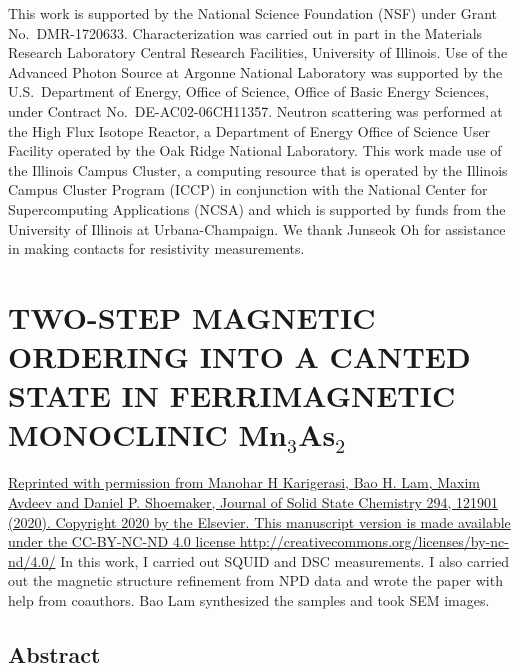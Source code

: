 \documentclass[letterpaper,10pt,doublespacing,edeposit]{uiucthesis2020}
\begin{document}
\begin{mainmatter}
This work is supported by the National Science Foundation (NSF) under Grant No.\ DMR-1720633.
Characterization was carried out in part in the Materials Research Laboratory Central Research Facilities, University of Illinois. Use of the Advanced Photon Source at Argonne National Laboratory was supported by the U.S.\ Department of Energy, Office of Science, Office of Basic Energy Sciences, under Contract No.\ DE-AC02-06CH11357. Neutron scattering was performed at the High Flux Isotope Reactor, a Department of Energy Office of Science User Facility operated by the Oak Ridge National Laboratory.
This work made use of the Illinois Campus Cluster, a computing resource that is operated by the Illinois Campus Cluster Program (ICCP) in conjunction with the National Center for Supercomputing Applications (NCSA) and which is supported by funds from the University of Illinois at Urbana-Champaign.
We thank Junseok Oh for assistance in making contacts for resistivity measurements.

\chapter{TWO-STEP MAGNETIC ORDERING INTO A CANTED STATE IN FERRIMAGNETIC MONOCLINIC Mn$_3$As$_2$}


\vspace{20mm}

\href{https://doi.org/10.1016/j.jssc.2020.121901}{Reprinted with permission from Manohar H Karigerasi, Bao H. Lam, Maxim Avdeev and Daniel P. Shoemaker, Journal of Solid State Chemistry 294, 121901 (2020). Copyright 2020 by the Elsevier. This manuscript version is made available under the CC-BY-NC-ND 4.0 license http://creativecommons.org/licenses/by-nc-nd/4.0/} In this work, I carried out SQUID and DSC measurements. I also carried out the magnetic structure refinement from NPD data and wrote the paper with help from coauthors. Bao Lam synthesized the samples and took SEM images.


\section{Abstract}


\end{mainmatter}
\end{document}
